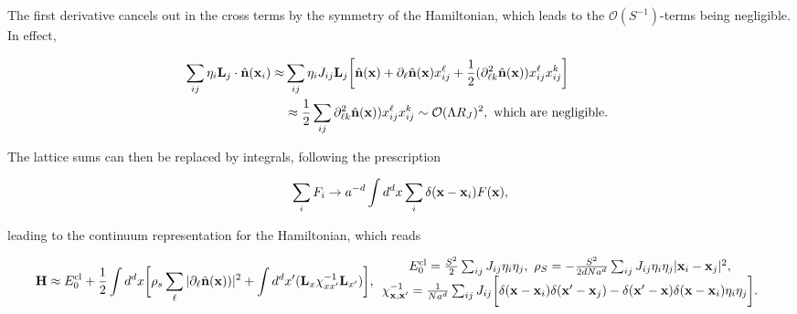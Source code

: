 The first derivative cancels out in the cross terms by the symmetry of the Hamiltonian, which leads to the $\mathcal{O}(S^{-1})$-terms being negligible. In effect,

\begin{equation}
    \begin{split}
        \sum_{ij} \eta_i {\bf L}_j \cdot\hat{{\bf n}}({\bf x}_i) \approx& \sum_{ij} \eta_i J_{ij} {\bf L}_j \bigg[ \hat{{\bf n}}({\bf x}) +  \partial_{\ell} \hat{{\bf n}}({\bf x}) x_{ij}^{\ell} + \frac{1}{2} (\partial_{\ell k}^2 \hat{{\bf n}}({\bf x})) x_{ij}^{\ell} x_{ij}^{k} \bigg] \\
        &\approx \frac{1}{2} \sum_{ij} \partial_{\ell k}^2 \hat{{\bf n}}({\bf x})) x_{ij}^{\ell} x_{ij}^{k} \sim \mathcal{O}(\Lambda R_J)^2, \textnormal{ which are negligible. }
    \end{split}
\end{equation}

The lattice sums can then be replaced by integrals, following the prescription

\begin{equation}
    \sum_{i} F_i \rightarrow a^{-d} \int d^d x \sum_{i} \delta({\bf x} - {\bf x}_i) F({\bf x}),
\end{equation}

leading to the continuum representation for the Hamiltonian, which reads

\begin{equation}
    {\bf H} \approx E_{0}^{\textnormal{cl}} + \frac{1}{2} \int d^d x \bigg[\rho_s \sum_{\ell} |\partial_{\ell} \hat{{\bf n}}({\bf x}))|^2 + \int d^d x' ({\bf L}_x \chi_{xx'}^{-1} {\bf L}_{x'})\bigg], \begin{array}{cc}
         E_{0}^{\textnormal{cl}} = \frac{S^2}{2} \sum_{ij} J_{ij} \eta_i \eta_j, \textnormal{ }
         \rho_S = - \frac{S^2}{2dNa^d} \sum_{ij} J_{ij} \eta_i \eta_j |{\bf x}_i - {\bf x}_j|^2, \\
         \chi_{{\bf x,x'}}^{-1} = \frac{1}{Na^d} \sum_{ij} J_{ij} \bigg[\delta({\bf x-x}_i)\delta({\bf x'-x}_j) - \delta({\bf x'-x}) \delta({\bf x-x}_i) \eta_i \eta_j \bigg].
    \end{array}
\end{equation}
